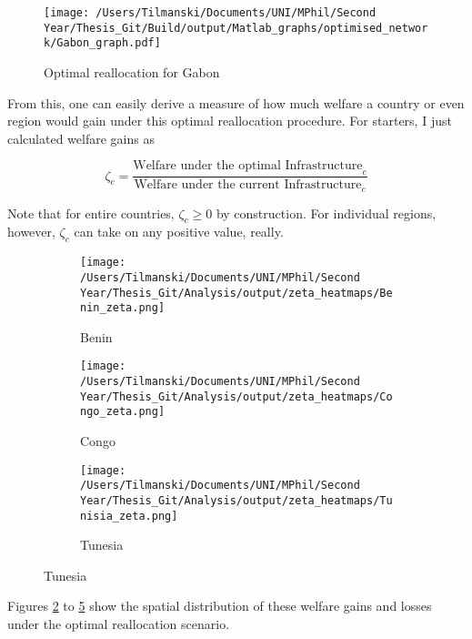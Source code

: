 \documentclass[11pt, oneside]{article}   	%
\begin{document}
\begin{figure}[!h]
\centering

\texttt{[image: /Users/Tilmanski/Documents/UNI/MPhil/Second Year/Thesis\_Git/Build/output/Matlab\_graphs/optimised\_network/Gabon\_graph.pdf]}
\caption{Optimal reallocation for Gabon}
\label{fig:reall_gabon}

\end{figure}

From this, one can easily derive a measure of how much welfare a country or even region would gain under this optimal reallocation procedure. For starters, I just calculated welfare gains as

\begin{equation}
  \zeta_{c} = \frac{\textrm{Welfare under the optimal Infrastructure}_{c}}{\textrm{Welfare under the current Infrastructure}_{c}}
\end{equation}

Note that for entire countries, $\zeta_{c} \geq 0$ by construction. For individual regions, however, $\zeta_{c}$ can take on any positive value, really.

\begin{figure}[h]
\centering
\caption{Spatial Distribution of $\zeta_{c}$ for sample countries}

\begin{subfigure}[c]{0.3\textwidth}
\texttt{[image: /Users/Tilmanski/Documents/UNI/MPhil/Second Year/Thesis\_Git/Analysis/output/zeta\_heatmaps/Benin\_zeta.png]}
\caption{Benin}
\label{fig:Benin_zeta}
\end{subfigure}
\begin{subfigure}[c]{0.3\textwidth}
\texttt{[image: /Users/Tilmanski/Documents/UNI/MPhil/Second Year/Thesis\_Git/Analysis/output/zeta\_heatmaps/Congo\_zeta.png]}
\caption{Congo}
\label{fig:Congo_zeta}
\end{subfigure}
\begin{subfigure}[c]{0.3\textwidth}
\texttt{[image: /Users/Tilmanski/Documents/UNI/MPhil/Second Year/Thesis\_Git/Analysis/output/zeta\_heatmaps/Tunisia\_zeta.png]}
\caption{Tunesia}
\label{fig:Tunisia_zeta}
\end{subfigure}

\end{figure}

Figures \ref{fig:Benin_zeta} to \ref{fig:Tunisia_zeta} show the spatial distribution of these welfare gains and losses under the optimal reallocation scenario.
\end{document}
